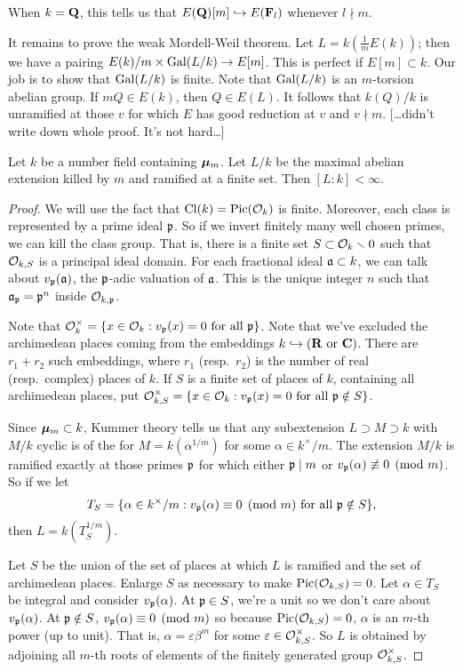 When $k=\mathbf{Q}$, this tells us that $E(\mathbf{Q})[m]\hookrightarrow E(\mathbf{F}_l)$ whenever 
$l\nmid m$. 

It remains to prove the weak Mordell-Weil theorem. Let $L=k(\frac 1 m E(k))$; 
then we have a pairing $E(k)/m\times \operatorname{Gal}(L/k)\to E[m]$. This is perfect if 
$E[m]\subset k$. Our job is to show that $\operatorname{Gal}(L/k)$ is finite. Note that 
$\operatorname{Gal}(L/k)$ is an $m$-torsion abelian group. If $m Q\in E(k)$, then 
$Q\in E(L)$. It follows that $k(Q)/k$ is unramified at those $v$ for which 
$E$ has good reduction at $v$ and $v\nmid m$. 
[\ldots didn't write down whole proof. It's not hard\ldots]

\begin{theorem}
Let $k$ be a number field containing ${\bm\mu}_m$. Let $L/k$ be the maximal abelian 
extension killed by $m$ and ramified at a finite set. Then $[L:k]<\infty$. 
\end{theorem}
\begin{proof}
We will use the fact that $\operatorname{Cl}(k)=\operatorname{Pic}(\mathcal{O}_k)$ is finite. Moreover, 
each class is represented by a prime ideal $\mathfrak{p}$. So if we invert finitely many 
well chosen primes, we can kill the class group. That is, there is a finite 
set $S\subset \mathcal{O}_k\smallsetminus 0$ such that $\mathcal{O}_{k,S}$ is a principal ideal 
domain. For each fractional ideal $\mathfrak{a}\subset k$, we can talk about 
$v_{\mathfrak{p}}(\mathfrak{a})$, the $\mathfrak{p}$-adic valuation of $\mathfrak{a}$. This is the unique integer 
$n$ such that $\mathfrak{a}_{\mathfrak{p}}=\mathfrak{p}^n$ inside $\mathcal{O}_{k,\mathfrak{p}}$. 

Note that $\mathcal{O}_k^\times=\{x\in \mathcal{O}_k:v_{\mathfrak{p}}(x)=0\text{ for all }\mathfrak{p}\}$. Note 
that we've excluded the archimedean places coming from the embeddings 
$k\hookrightarrow (\mathbf{R}\text{ or }\mathbf{C})$. There are $r_1+r_2$ such embeddings, where 
$r_1$ (resp.~$r_2$) is the number of real (resp.~complex) places of $k$. If 
$S$ is a finite set of places of $k$, containing all archimedean places, put 
$\mathcal{O}_{k,S}^\times=\{x\in \mathcal{O}_k:v_{\mathfrak{p}}(x)=0\text{ for all }\mathfrak{p}\notin S\}$. 

Since ${\bm\mu}_m\subset k$, Kummer theory tells us that any subextension 
$L\supset M\supset k$ with $M/k$ cyclic is of the for $M=k(\alpha^{1/m})$ 
for some $\alpha\in k^\times/m$. The extension $M/k$ is ramified exactly at 
those primes $\mathfrak{p}$ for which either $\mathfrak{p}\mid m$ or 
$v_{\mathfrak{p}}(\alpha)\not\equiv 0\pmod m$. So if we let 
\[
  T_S=\{\alpha\in k^\times/m:v_{\mathfrak{p}}(\alpha)\equiv 0\pmod m\text{ for all }\mathfrak{p}\notin S\} ,
\]
then $L=k(T_S^{1/m})$. 

Let $S$ be the union of the set of places at which $L$ is ramified and the set 
of archimedean places. Enlarge $S$ as necessary to make $\operatorname{Pic}(\mathcal{O}_{k,S})=0$. 
Let $\alpha\in T_S$ be integral and consider $v_{\mathfrak{p}}(\alpha)$. At $\mathfrak{p}\in S$, 
we're a unit so we don't care about $v_{\mathfrak{p}}(\alpha)$. At $\mathfrak{p}\notin S$, 
$v_{\mathfrak{p}}(\alpha)\equiv 0\pmod m$ so because $\operatorname{Pic}(\mathcal{O}_{k,S})=0$, $\alpha$ is 
an $m$-th power (up to unit). That is, $\alpha = \varepsilon \beta^m$ for 
some $\varepsilon\in \mathcal{O}_{k,S}^\times$. So $L$ is obtained by adjoining all 
$m$-th roots of elements of the finitely generated group $\mathcal{O}_{k,S}^\times$. 
\end{proof}

